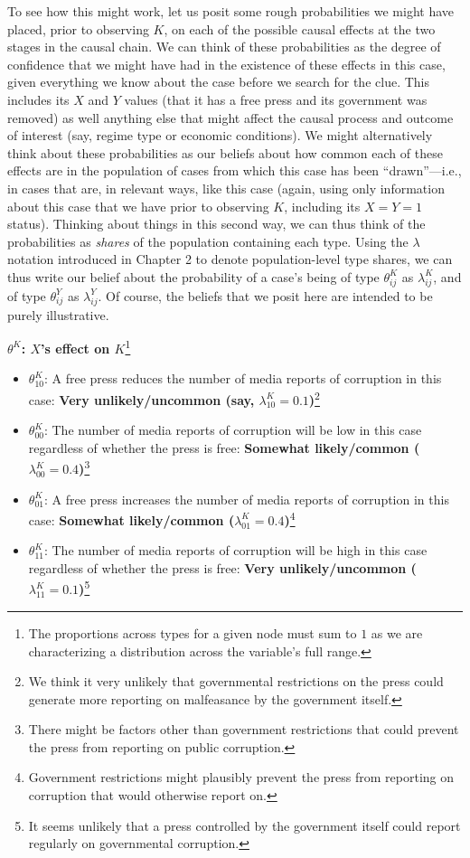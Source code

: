 \documentclass[12pt,]{book}
\let\rmarkdownfootnote\footnote%
\def\footnote{\protect\rmarkdownfootnote}
\begin{document}
To see how this might work, let us posit some rough probabilities we might have placed, prior to observing \(K\), on each of the possible causal effects at the two stages in the causal chain. We can think of these probabilities as the degree of confidence that we might have had in the existence of these effects in this case, given everything we know about the case before we search for the clue. This includes its \(X\) and \(Y\) values (that it has a free press and its government was removed) as well anything else that might affect the causal process and outcome of interest (say, regime type or economic conditions). We might alternatively think about these probabilities as our beliefs about how common each of these effects are in the population of cases from which this case has been ``drawn''---i.e., in cases that are, in relevant ways, like this case (again, using only information about this case that we have prior to observing \(K\), including its \(X=Y=1\) status). Thinking about things in this second way, we can thus think of the probabilities as \emph{shares} of the population containing each type. Using the \(\lambda\) notation introduced in Chapter 2 to denote population-level type shares, we can thus write our belief about the probability of a case's being of type \(\theta_{ij}^K\) as \(\lambda_{ij}^K\), and of type \(\theta_{ij}^Y\) as \(\lambda_{ij}^Y\). Of course, the beliefs that we posit here are intended to be purely illustrative.

\textbf{\(\theta^K\): \(X\)'s effect on \(K\)}\footnote{The proportions across types for a given node must sum to \(1\) as we are characterizing a distribution across the variable's full range.}

\begin{itemize}
\item
  \(\theta_{10}^{K}\): A free press reduces the number of media reports of corruption in this case: \textbf{Very unlikely/uncommon (say, \(\lambda^K_{10}=0.1\))}\footnote{We think it very unlikely that governmental restrictions on the press could generate more reporting on malfeasance by the government itself.}
\item
  \textbf{\(\theta_{00}^{K}\)}: The number of media reports of corruption will be low in this case regardless of whether the press is free: \textbf{Somewhat likely/common (\(\lambda^K_{00}=0.4\))}\footnote{There might be factors other than government restrictions that could prevent the press from reporting on public corruption.}
\item
  \textbf{\(\theta_{01}^{K}\)}: A free press increases the number of media reports of corruption in this case: \textbf{Somewhat likely/common (\(\lambda^K_{01}=0.4\))}\footnote{Government restrictions might plausibly prevent the press from reporting on corruption that would otherwise report on.}
\item
  \textbf{\(\theta_{11}^{K}\)}: The number of media reports of corruption will be high in this case regardless of whether the press is free: \textbf{Very unlikely/uncommon (\(\lambda^K_{11}=0.1\))}\footnote{It seems unlikely that a press controlled by the government itself could report regularly on governmental corruption.}
\end{itemize}
\end{document}
